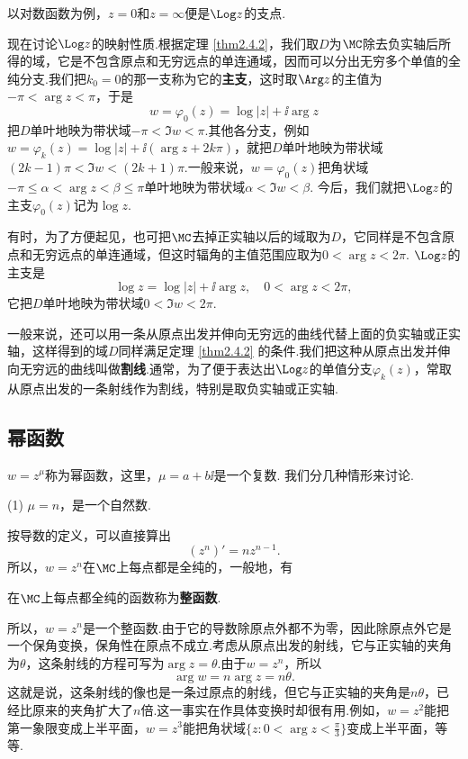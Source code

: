 以对数函数为例，$z=0$和$z=\infty$便是$\Log z$的支点.

现在讨论$\Log z$的映射性质.根据定理 \ref{thm2.4.2}，我们取$D$为$\MC$除去负实轴后所得的域，它是不包含原点和无穷远点的单连通域，因而可以分出无穷多个单值的全纯分支.我们把$k_0=0$的那一支称为它的\textbf{主支}，这时取$\Arg z$的主值为$-\pi<\arg z<\pi$，于是
\[w=\varphi_0(z)=\log|z|+\ii\arg z\]
把$D$单叶地映为带状域$-\pi<\Im w<\pi$.其他各分支，例如$w=\varphi_k(z)=\log|z|+\ii(\arg z+2k\pi)$，就把$D$单叶地映为带状域$(2k-1)\pi<\Im w<(2k+1)\pi$.一般来说，$w=\varphi_0(z)$把角状域$-\pi\le\alpha<\arg z<\beta\le\pi$单叶地映为带状域$\alpha<\Im w<\beta$. 今后，我们就把$\Log z$的主支$\varphi_0(z)$记为$\log z$.

有时，为了方便起见，也可把$\MC$去掉正实轴以后的域取为$D$，它同样是不包含原点和无穷远点的单连通域，但这时辐角的主值范围应取为$0<\arg z<2\pi$. $\Log z$的主支是
\[\log z=\log|z|+\ii\arg z,\quad 0<\arg z<2\pi,\]
它把$D$单叶地映为带状域$0<\Im w<2\pi$.

一般来说，还可以用一条从原点出发并伸向无穷远的曲线代替上面的负实轴或正实轴，这样得到的域$D$同样满足定理 \ref{thm2.4.2} 的条件.我们把这种从原点出发并伸向无穷远的曲线叫做\textbf{割线}.通常，为了便于表达出$\Log z$的单值分支$\varphi_k(z)$，常取从原点出发的一条射线作为割线，特别是取负实轴或正实轴.

\subsection{幂函数}
$w=z^\mu$称为幂函数，这里，$\mu=a+b\ii$是一个复数. 我们分几种情形来讨论.

(1) $\mu=n$，{\kaishu 是一个自然数.}

按导数的定义，可以直接算出
\[(z^n)'=nz^{n-1}.\]
所以，$w=z^n$在$\MC$上每点都是全纯的，一般地，有
\begin{definition}\label{def2.4.4}
  在$\MC$上每点都全纯的函数称为\textbf{整函数}.
\end{definition}

所以，$w=z^n$是一个整函数.由于它的导数除原点外都不为零，因此除原点外它是一个保角变换，保角性在原点不成立.考虑从原点出发的射线，它与正实轴的夹角为$\theta$，这条射线的方程可写为$\arg z=\theta$.由于$w=z^n$，所以
\[\arg w=n\arg z=n\theta.\]
这就是说，这条射线的像也是一条过原点的射线，但它与正实轴的夹角是$n\theta$，已经比原来的夹角扩大了$n$倍.这一事实在作具体变换时却很有用.例如，$w=z^2$能把第一象限变成上半平面，$w=z^3$能把角状域$\bigg\{z:0<\arg z<\frac\pi3\bigg\}$变成上半平面，等等.

